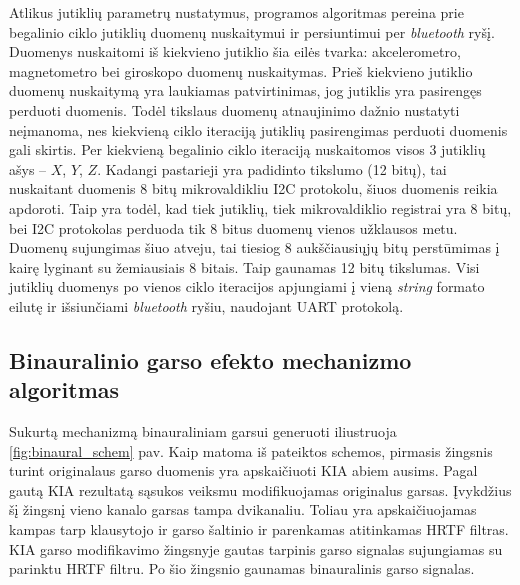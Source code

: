 \documentclass[]{vgtuef}
\begin{document}
Atlikus jutiklių parametrų nustatymus, programos algoritmas pereina prie begalinio ciklo jutiklių duomenų nuskaitymui ir persiuntimui per \textit{bluetooth} ryšį. Duomenys nuskaitomi iš kiekvieno jutiklio šia eilės tvarka: akcelerometro, magnetometro bei giroskopo duomenų nuskaitymas. Prieš kiekvieno jutiklio duomenų nuskaitymą yra laukiamas patvirtinimas, jog jutiklis yra pasirengęs perduoti duomenis. Todėl tikslaus duomenų atnaujinimo dažnio nustatyti neįmanoma, nes kiekvieną ciklo iteraciją jutiklių pasirengimas perduoti duomenis gali skirtis. Per kiekvieną begalinio ciklo iteraciją nuskaitomos visos 3 jutiklių ašys – $X$, $Y$, $Z$. Kadangi pastarieji yra padidinto tikslumo (12 bitų), tai nuskaitant duomenis 8 bitų mikrovaldikliu I2C protokolu, šiuos duomenis reikia apdoroti. Taip yra todėl, kad tiek jutiklių, tiek mikrovaldiklio registrai yra 8 bitų, bei I2C protokolas perduoda tik 8 bitus duomenų vienos užklausos metu. Duomenų sujungimas šiuo atveju, tai tiesiog 8 aukščiausiųjų bitų perstūmimas į kairę lyginant su žemiausiais 8 bitais. Taip gaunamas 12 bitų tikslumas. Visi jutiklių duomenys po vienos ciklo iteracijos apjungiami į vieną \textit{string} formato eilutę ir išsiunčiami \textit{bluetooth} ryšiu, naudojant UART protokolą.

\subsection{Binauralinio garso efekto mechanizmo algoritmas}

Sukurtą mechanizmą binauraliniam garsui generuoti iliustruoja \ref{fig:binaural_schem} pav. Kaip matoma iš  pateiktos schemos, pirmasis žingsnis turint originalaus garso duomenis yra apskaičiuoti KIA abiem ausims. Pagal gautą KIA rezultatą sąsukos veiksmu modifikuojamas originalus garsas. Įvykdžius šį žingsnį vieno kanalo garsas tampa dvikanaliu. Toliau yra apskaičiuojamas kampas tarp klausytojo ir garso šaltinio ir parenkamas atitinkamas HRTF filtras. KIA garso modifikavimo žingsnyje gautas tarpinis garso signalas sujungiamas su parinktu HRTF filtru. Po šio žingsnio gaunamas binauralinis garso signalas.
\end{document}
